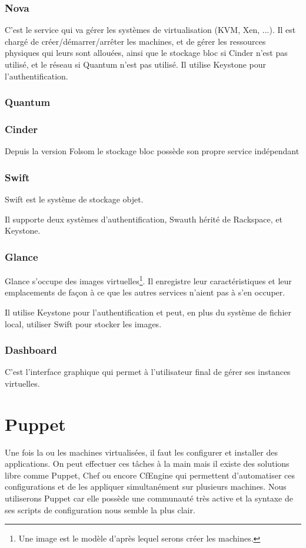 \documentclass[a4paper,oneside]{report}
\begin{document}
\subsubsection{Nova}
C'est le service qui va gérer les systèmes de \gls{virtualisation} (KVM, Xen, ...).
Il est chargé de créer/démarrer/arrêter les machines, et de gérer les ressources physiques qui leurs sont allouées, ainsi que le stockage bloc si Cinder n'est pas utilisé, et le réseau si Quantum n'est pas utilisé.\newline
Il utilise Keystone pour l'authentification.


\subsubsection{Quantum}


\subsubsection{Cinder}
Depuis la version Folsom le stockage bloc possède son propre service indépendant 



\subsubsection{Swift}
Swift est le système de stockage objet. 

Il supporte deux systèmes d'authentification, Swauth hérité de Rackspace, et Keystone.

\subsubsection{Glance}
Glance s'occupe des images virtuelles\footnote{Une image est le modèle d'après lequel serons créer les machines.}.
Il enregistre leur caractéristiques et leur emplacements de façon à ce que les autres services n'aient pas à s'en occuper.

Il utilise Keystone pour l'authentification et peut, en plus du système de fichier local, utiliser Swift pour stocker les images.

\subsubsection{Dashboard}
C'est l'interface graphique qui permet à l'utilisateur final de gérer ses instances virtuelles.

\section{Puppet}
Une fois la ou les machines virtualisées, il faut les configurer et installer des applications. On peut effectuer ces tâches à la main mais il existe des solutions libre comme Puppet, Chef ou encore CfEngine qui permettent d'automatiser ces configurations et de les appliquer simultanément sur plusieurs machines.
Nous utiliserons Puppet car elle possède une communauté très active et la syntaxe de ses scripts de configuration nous semble la plus clair.
\end{document}
